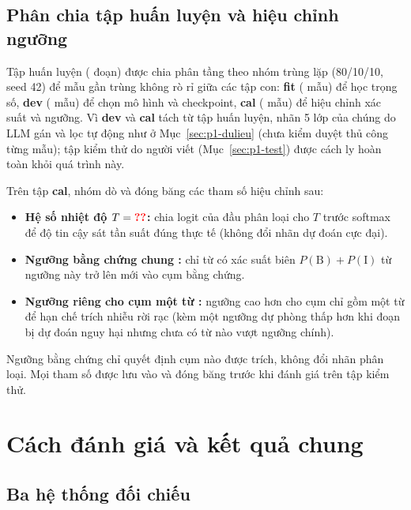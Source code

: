 \subsection{Phân chia tập huấn luyện và hiệu chỉnh ngưỡng}
\label{sec:p2-nguong}

Tập huấn luyện ( đoạn) được chia phân tầng theo nhóm trùng lặp (80/10/10, seed 42) để mẫu gần trùng không rò
rỉ giữa các tập con: \textbf{fit} ( mẫu) để học trọng số, \textbf{dev} ( mẫu) để chọn
mô hình và checkpoint, \textbf{cal} ( mẫu) để hiệu chỉnh xác suất và ngưỡng. Vì \textbf{dev} và
\textbf{cal} tách từ tập huấn luyện, nhãn 5 lớp của chúng do LLM gán và lọc tự động như ở Mục~\ref{sec:p1-dulieu} (chưa
kiểm duyệt thủ công từng mẫu); tập kiểm thử do người viết (Mục~\ref{sec:p1-test}) được cách ly hoàn toàn khỏi quá trình
này.

Trên tập \textbf{cal}, nhóm dò và đóng băng các tham số hiệu chỉnh sau:

\begin{itemize}
  \item \textbf{Hệ số nhiệt độ $T = \so{v2.T}$:} chia logit của đầu phân loại cho $T$ trước softmax để độ tin cậy sát
        tần suất đúng thực tế (không đổi nhãn dự đoán cực đại).
  \item \textbf{Ngưỡng bằng chứng chung :} chỉ từ có xác suất biên $P(\text{B}) + P(\text{I})$ từ ngưỡng
        này trở lên mới vào cụm bằng chứng.
  \item \textbf{Ngưỡng riêng cho cụm một từ :} ngưỡng cao hơn cho cụm chỉ gồm một từ để hạn chế trích
        nhiễu rời rạc (kèm một ngưỡng dự phòng thấp hơn khi đoạn bị dự đoán nguy hại nhưng chưa có từ nào vượt ngưỡng
        chính).
\end{itemize}

Ngưỡng bằng chứng chỉ quyết định cụm nào được trích, không đổi nhãn phân loại. Mọi tham số được lưu vào
 và đóng băng trước khi đánh giá trên tập kiểm thử.

\section{Cách đánh giá và kết quả chung}
\label{sec:p2-danh-gia}

\subsection{Ba hệ thống đối chiếu}

